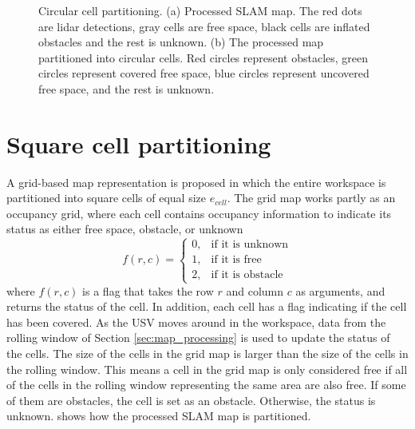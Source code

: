 \begin{figure}[h!]
{\begin{subfigure}[b]{0.5\textwidth}
		\caption{}
	\end{subfigure}
	}
	\caption[Circular cell partitioning.]{Circular cell partitioning. (a) Processed SLAM map. The red dots are lidar detections, gray cells are free space, black cells are inflated obstacles and the rest is unknown. (b) The processed map partitioned into circular cells. Red circles represent obstacles, green circles represent covered free space, blue circles represent uncovered free space, and the rest is unknown.} \label{fig:circle_partition}
\end{figure}

\FloatBarrier

\section{Square cell partitioning} \label{sec:square_partition}


A grid-based map representation is proposed in which the entire workspace is partitioned into square cells of equal size $e_{cell}$. The grid map works partly as an occupancy grid, where each cell contains occupancy information to indicate its status as either free space, obstacle, or unknown
\begin{equation} \label{eq:square_cell_status}
f(r,c) = 
\begin{cases}
0, & \text{if it is unknown} \\
1, & \text{if it is free} \\
2, & \text{if it is obstacle} 
\end{cases}
\end{equation}
where $f(r,c)$ is a flag that takes the row $r$ and column $c$ as arguments, and returns the status of the cell. In addition, each cell has a flag indicating if the cell has been covered. As the USV moves around in the workspace, data from the rolling window of Section \ref{sec:map_processing} is used to update the status of the cells. The size of the cells in the grid map is larger than the size of the cells in the rolling window. This means a cell in the grid map is only considered free if all of the cells in the rolling window representing the same area are also free. If some of them are obstacles, the cell is set as an obstacle. Otherwise, the status is unknown.  shows how the processed SLAM map is partitioned.

